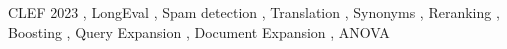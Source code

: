\documentclass{ceurart}
\begin{document}
\begin{keywords}
  CLEF 2023 \sep
  LongEval \sep
  Spam detection \sep
  Translation \sep
  Synonyms \sep
  Reranking \sep
  Boosting \sep
  Query Expansion \sep
  Document Expansion \sep
  ANOVA
\end{keywords}

\maketitle




%








\end{document}
